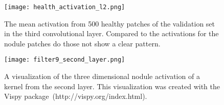 \documentclass[main.tex]{subfiles}
\begin{document}
\begin{figure}
\begin{center}
\texttt{[image: health\_activation\_l2.png]}
\end{center}
\caption{The mean activation from 500 healthy patches of the validation set in the third convolutional layer. Compared to the activations for the nodule patches do those not show a clear pattern.}
\label{fig:mean_activation_l2_health}
\end{figure}


\begin{figure}
\begin{center}
\texttt{[image: filter9\_second\_layer.png]}
\end{center}
\caption{A visualization of the three dimensional nodule activation of a kernel from the second layer. This visualization was created with the Vispy package~(http://vispy.org/index.html).}
\label{fig:3d_activation}
\end{figure}
\end{document}
